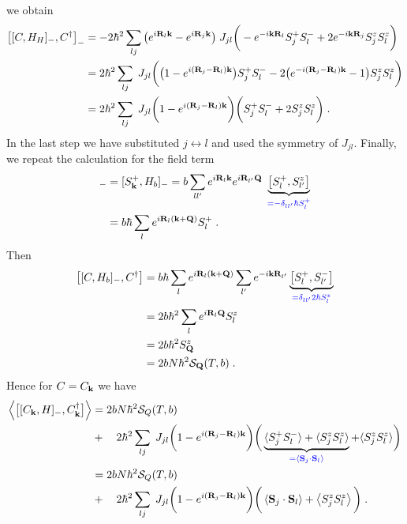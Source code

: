 %
we obtain
\begin{align*}
\big[[C,H_{H}]_{-},C^{\dagger}\big]_{-}&=
-2\hbar^{2} \sum_{lj} \big(e^{i\mathbf R_{l}\mathbf k}  - e^{i\mathbf R_{j}\mathbf k} \big)\;J_{jl}
\bigg(- e^{-i\mathbf k\mathbf R_{l}}S^{+}_{j}  S^{-}_{l}
+2 e^{-i\mathbf k\mathbf R_{j}} S^{z}_{j}S^{z}_{l}
\bigg)\\
&=
2\hbar^{2} \sum_{lj}\;J_{jl}
\bigg(  \big(1 - e^{i(\mathbf R_{j}-\mathbf R_{l})\mathbf k} \big)S^{+}_{j}  S^{-}_{l}
-2\big( e^{-i(\mathbf R_{j}-\mathbf R_{l})\mathbf k} -1\big) S^{z}_{j}S^{z}_{l}
\bigg)\\
&=
2\hbar^{2} \sum_{lj}\;J_{jl}
  \bigg(1 - e^{i(\mathbf R_{j}-\mathbf R_{l})\mathbf k} \bigg)
\bigg(S^{+}_{j}  S^{-}_{l} + 2 S^{z}_{j}S^{z}_{l}\bigg)\;.
\end{align*}
In the last step we have substituted $j\leftrightarrow l$ and used the symmetry of $J_{jl}$.
Finally, we repeat the calculation for the field term
%
\begin{align*}
[C,H_{b}]_{-} &= [S^{+}_{\vv k},H_{b}]_{-} 
= b \sum_{ll'}e^{i\vv R_{l}\vv k} e^{i\vv R_{l'}\vv Q}\;\underbrace{
\big[ S_{l}^{+},S^{z}_{l'}\big]
}_{\color{blue} = -\delta_{ll'}\hbar S^{+}_{l}}\\
&=b\hbar \sum_{l}  e^{i\vv R_{l}(\vv k +\vv Q)}	 S^{+}_{l}\;.
\end{align*}
%
Then
\begin{align*}
\big[[C,H_{b}]_{-},C^{\dagger}\big] 
&=b\hbar \sum_{l}  e^{i\mathbf R_{l}(\mathbf k +\mathbf Q)}	\sum_{l'}e^{-i \mathbf k\mathbf R_{l'}} 
\underbrace{
\big[S^{+}_{l},S^{-}_{l'}\big]
}_{\color{blue} = \delta_{ll'} 2\hbar S^{z}_{l}}\\
&=2 b\hbar^{2} \sum_{l}  e^{i\mathbf R_{l} \mathbf Q}	 S^{z}_{l}\\
&=2 b\hbar^{2}  S^{z}_{\mathbf Q} \\
&= 2 b N \hbar^{2}{\cal S}_{\mathbf Q}(T,b)\;.
\end{align*}
Hence for $C=C_{\mathbf k}$ we have
\begin{align*}
\left\langle\big[[C_{\mathbf k},H]_{-},C^{\dagger}_{\mathbf k}\big] \right\rangle
&=2 bN\hbar^{2}  {\cal S}_{Q}(T,b)\\
&+\quad 2\hbar^{2} \sum_{lj}\;J_{jl}
  \bigg(1 - e^{i(\mathbf R_{j}-\mathbf R_{l})\mathbf k} \bigg)
\bigg(\underbrace{
\langle S^{+}_{j}  S^{-}_{l}\rangle + \langle S^{z}_{j}S^{z}_{l}\rangle
}_{\color{blue} = \left\langle\mathbf S_{j}\cdot \mathbf S_{l}\right\rangle}
+\langle S^{z}_{j}S^{z}_{l}\rangle\bigg)\\
&=2 b N\hbar^{2}  {\cal S}_{Q}(T,b)\\
&+\quad 2\hbar^{2} \sum_{lj}\;J_{jl}
  \bigg(1 - e^{i(\mathbf R_{j}-\mathbf R_{l})\mathbf k} \bigg)
\bigg( \left\langle\mathbf S_{j}\cdot \mathbf S_{l}\right\rangle
+\left\langle S^{z}_{j}S^{z}_{l}\right\rangle\bigg)\;.
\end{align*}

